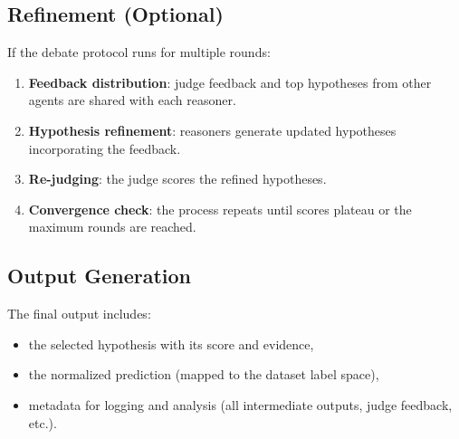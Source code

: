 \subsection{Refinement (Optional)}
If the debate protocol runs for multiple rounds:
\begin{enumerate}
  \item \textbf{Feedback distribution}: judge feedback and top hypotheses from other agents are
        shared with each reasoner.
  \item \textbf{Hypothesis refinement}: reasoners generate updated hypotheses incorporating the
        feedback.
  \item \textbf{Re-judging}: the judge scores the refined hypotheses.
  \item \textbf{Convergence check}: the process repeats until scores plateau or the maximum rounds
        are reached.
\end{enumerate}

\subsection{Output Generation}
The final output includes:
\begin{itemize}
  \item the selected hypothesis with its score and evidence,
  \item the normalized prediction (mapped to the dataset label space),
  \item metadata for logging and analysis (all intermediate outputs, judge feedback, etc.).
\end{itemize}
